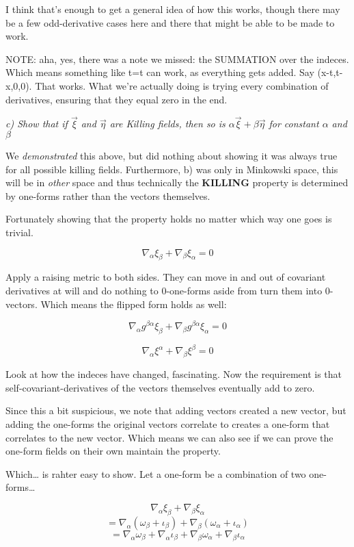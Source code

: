 \documentclass[landscape,letterpaper,10pt,english]{article}
\begin{document}
I think that's enough to get a general idea of how this works, though
there may be a few odd-derivative cases here and there that might be
able to be made to work.

NOTE: aha, yes, there was a note we missed: the SUMMATION over the
indeces. Which means something like t=t can work, as everything gets
added. Say (x-t,t-x,0,0). That works. What we're actually doing is
trying every combination of derivatives, ensuring that they equal zero
in the end.

    \emph{c) Show that if \(\vec \xi\) and \(\vec \eta\) are Killing fields,
then so is \(\alpha\vec\xi+\beta\vec\eta\) for constant \(\alpha\) and
\(\beta\)}

    We \emph{demonstrated} this above, but did nothing about showing it was
always true for all possible killing fields. Furthermore, b) was only in
Minkowski space, this will be in \emph{other} space and thus technically
the \textbf{KILLING} property is determined by one-forms rather than the
vectors themselves.

Fortunately showing that the property holds no matter which way one goes
is trivial.

\[\nabla_\alpha \xi_\beta + \nabla_\beta \xi_\alpha = 0\]

Apply a raising metric to both sides. They can move in and out of
covariant derivatives at will and do nothing to 0-one-forms aside from
turn them into 0-vectors. Which means the flipped form holds as well:

\[\nabla_\alpha g^{\beta\alpha} \xi_\beta + \nabla_\beta g^{\beta\alpha} \xi_\alpha = 0\]

\[\nabla_\alpha \xi^\alpha + \nabla_\beta \xi^\beta = 0\]

Look at how the indeces have changed, fascinating. Now the requirement
is that self-covariant-derivatives of the vectors themselves eventually
add to zero.

    Since this a bit suspicious, we note that adding vectors created a new
vector, but adding the one-forms the original vectors correlate to
creates a one-form that correlates to the new vector. Which means we can
also see if we can prove the one-form fields on their own maintain the
property.

Which\ldots{} is rahter easy to show. Let a one-form be a combination of
two one-forms\ldots{}

\[\nabla_\alpha \xi_\beta + \nabla_\beta \xi_\alpha \]
\[ = \nabla_\alpha (\omega_\beta + \iota_\beta) + \nabla_\beta (\omega_\alpha + \iota_\alpha) \]
\[ = \nabla_\alpha \omega_\beta + \nabla_\alpha \iota_\beta + \nabla_\beta \omega_\alpha + \nabla_\beta \iota_\alpha \]
\end{document}
